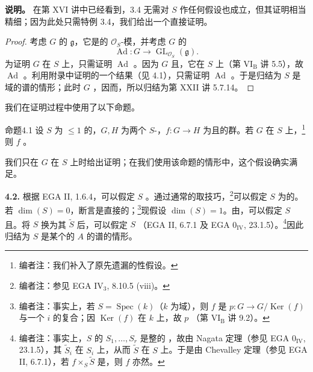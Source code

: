 \textbf{说明。} 在第 XVI 讲中已经看到，3.4 无需对 $S$ 作任何假设也成立，但其证明相当精细；因为此处只需特例 3.4，我们给出一个直接证明。
\begin{proof}
考虑 $G$ 的 $\mathfrak g$，它是的 $\mathcal O_S$-模，并考虑 $G$ 的
\[\operatorname{Ad}:G\longrightarrow\operatorname{GL}_{\mathcal O_S}(\mathfrak g).\]
为证明 $G$ 在 $S$ 上，只需证明 $\operatorname{Ad}$ 。因为 $G$ 且，它在 $S$ 上（第 VI$_{\mathrm B}$ 讲 5.5），故 $\operatorname{Ad}$ 。利用附录中证明的一个结果（见 4.1），只需证明 $\operatorname{Ad}$ 。于是归结为 $S$ 是域的谱的情形；此时 $G$ ，因而，所以归结为第 XXII 讲 5.7.14。
\end{proof}

我们在证明过程中使用了以下命题。
\begin{SGAresult}{命题}{4.1}
设 $S$ 为 $\leq1$ 的，$G,H$ 为两个 $S$-，$f:G\to H$ 为且的群。若 $G$ 在 $S$ 上，\footnote{编者注：我们补入了原先遗漏的性假设。}则 $f$ 。
\end{SGAresult}
我们只在 $G$ 在 $S$ 上时给出证明；在我们使用该命题的情形中，这个假设确实满足。

\textbf{4.2.} 根据 EGA II, 1.6.4，可以假定 $S$ 。通过通常的取技巧，\footnote{编者注：参见 EGA IV$_3$, 8.10.5 (viii)。}可以假定 $S$ 为的。若 $\dim(S)=0$，断言是直接的；\footnote{编者注：事实上，若 $S=\operatorname{Spec}(k)$（$k$ 为域），则 $f$ 是 $p:G\to G/\operatorname{Ker}(f)$ 与一个 $i$ 的复合；因 $\operatorname{Ker}(f)$ 在 $k$ 上，故 $p$ （第 VI$_{\mathrm B}$ 讲 9.2）。}现假设 $\dim(S)=1$。由，可以假定 $S$ 且。将 $S$ 换为其 $\widetilde S$ 后，可以假定 $S$ （EGA II, 6.7.1 及 EGA 0$_{\mathrm{IV}}$, 23.1.5）。\footnote{编者注：事实上，$S$ 的 $S_1,\ldots,S_r$ 是整的 ，故由 Nagata 定理（参见 EGA 0$_{\mathrm{IV}}$, 23.1.5），其 $\widetilde S_i$ 在 $S_i$ 上，从而 $\widetilde S$ 在 $S$ 上。于是由 Chevalley 定理（参见 EGA II, 6.7.1），若 $f\times_S\widetilde S$ 是，则 $f$ 亦然。}因此归结为 $S$ 是某个的 $A$ 的谱的情形。

